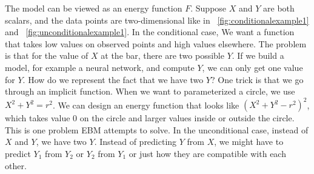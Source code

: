 The model can be viewed as an energy function $F$. 
Suppose $X$ and $Y$ are both scalars, and the data points are two-dimensional like in ~\cref{fig:conditionalexample1} and ~\cref{fig:unconditionalexample1}. 
In the conditional case, We want a function that takes low values on observed points and high values elsewhere. 
The problem is that for the value of $X$ at the bar, there are two possible $Y$. 
If we build a model, for example a neural network, and compute $Y$, we can only get one value for $Y$. 
How do we represent the fact that we have two $Y$? One trick is that we go through an implicit function. 
When we want to parameterized a circle, we use $X^2+Y^2=r^2$. 
We can design an energy function that looks like $(X^2+Y^2-r^2)^2$, which takes value 0 on the circle and larger values inside or outside the circle. 
This is one problem EBM attempts to solve. 
In the unconditional case, instead of $X$ and $Y$, we have two $Y$. 
Instead of predicting $Y$ from $X$, we might have to predict $Y_1$ from $Y_2$ or $Y_2$ from $Y_1$ or just how they are compatible with each other. 


